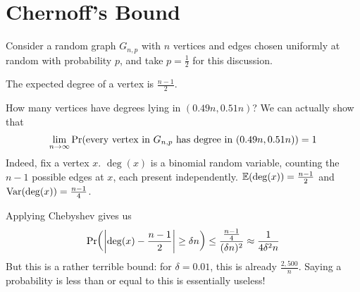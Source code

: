 \section{Chernoff's Bound}

Consider a random graph $G_{n, p}$ with $n$ vertices and edges chosen uniformly at random with probability $p$, and take $p = \frac{1}{2}$ for this discussion.

The expected degree of a vertex is $\frac{n-1}{2}$.

How many vertices have degrees lying in $(0.49n, 0.51n)$? We can actually show that
\begin{align*}
    \lim_{n \to \infty} \Pr\!\left( \text{every vertex in $G_{n, p}$ has degree in $(0.49n, 0.51n)$} \right) = 1
\end{align*}
Indeed, fix a vertex $x$. $\deg(x)$ is a binomial random variable, counting the $n - 1$ possible edges at $x$, each present independently. $\mathbb{E}\!\left( \deg(x) \right) = \frac{n-1}{2}$ and $\operatorname{Var}\!\left( \deg(x) \right) = \frac{n-1}{4}$.

Applying Chebyshev gives us
\begin{align*}
    \Pr\!\left( \left\lvert \deg(x) - \frac{n-1}{2} \right\rvert \geq \delta n \right) \leq \frac{\frac{n-1}{4}}{(\delta n)^2}
    \approx \frac{1}{4 \delta^2 n}
\end{align*}
But this is a rather terrible bound: for $\delta = 0.01$, this is already $\frac{2,500}{n}$. Saying a probability is less than or equal to this is essentially useless!

